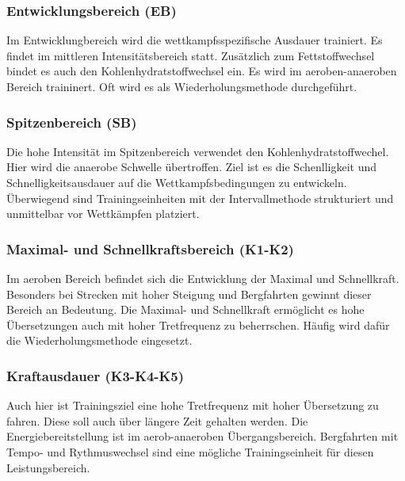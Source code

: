 \subsubsection{Entwicklungsbereich (EB)}
Im Entwicklungbereich wird die wettkampfsspezifische Ausdauer trainiert. Es findet im mittleren Intensitätsbereich statt. Zusätzlich zum Fettstoffwechsel bindet es auch den Kohlenhydratstoffwechsel ein. Es wird im aeroben-anaeroben Bereich traininert. Oft wird es als Wiederholungsmethode durchgeführt.
\subsubsection{Spitzenbereich (SB)}
Die hohe Intensität im Spitzenbereich verwendet den Kohlenhydratstoffwechel. Hier wird die anaerobe Schwelle übertroffen. Ziel ist es die Schenlligkeit und Schnelligkeitsausdauer auf die Wettkampfsbedingungen zu entwickeln. Überwiegend sind Trainingseinheiten mit der Intervallmethode strukturiert und unmittelbar vor Wettkämpfen platziert.
\subsubsection{Maximal- und Schnellkraftsbereich (K1-K2)}
Im aeroben Bereich befindet sich die Entwicklung der Maximal und Schnellkraft. Besonders bei Strecken mit hoher Steigung und Bergfahrten gewinnt dieser Bereich an Bedeutung. Die Maximal- und Schnellkraft ermöglicht es hohe Übersetzungen auch mit hoher Tretfrequenz zu beherrschen. Häufig wird dafür die Wiederholungsmethode eingesetzt.
\subsubsection{Kraftausdauer (K3-K4-K5)}
Auch hier ist Trainingsziel eine hohe Tretfrequenz mit hoher Übersetzung zu fahren. Diese soll auch über längere Zeit gehalten werden. Die Energiebereitstellung ist im aerob-anaeroben Übergangsbereich. Bergfahrten mit Tempo- und Rythmuswechsel sind eine mögliche Trainingseinheit für diesen Leistungsbereich.
